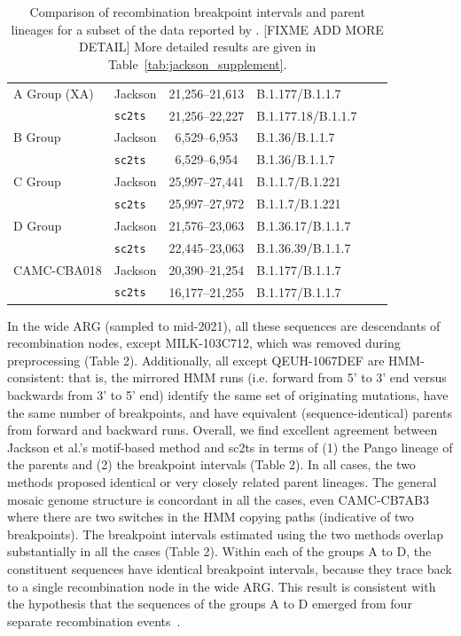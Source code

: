 \documentclass{article}
\begin{document}
\begin{table} \centering
\begin{tabular}{ll|clll}
\toprule
A Group (XA) & Jackson        &  21,256–21,613 & B.1.177/B.1.1.7 \\
             & \texttt{sc2ts} &  21,256--22,227 & B.1.177.18/B.1.1.7 \\
\midrule
B Group & Jackson        &  6,529--6,953 & B.1.36/B.1.1.7  \\
        & \texttt{sc2ts} &  6,529--6,954 & B.1.36/B.1.1.7  \\
\midrule
C Group & Jackson        &  25,997--27,441 &  B.1.1.7/B.1.221 \\
        & \texttt{sc2ts} &  25,997--27,972 &  B.1.1.7/B.1.221 \\
\midrule
D Group & Jackson        &  21,576--23,063 &  B.1.36.17/B.1.1.7 \\
        & \texttt{sc2ts} &  22,445--23,063 &  B.1.36.39/B.1.1.7 \\
\midrule
CAMC-CBA018 & Jackson        &  20,390--21,254 & B.1.177/B.1.1.7 \\
            & \texttt{sc2ts} &  16,177--21,255 & B.1.177/B.1.1.7 \\
\midrule
\end{tabular}
\caption{\label{tab:jackson}Comparison of recombination breakpoint intervals and parent lineages for a subset of the data reported by \cite{Jackson2021-ik}. [FIXME ADD MORE DETAIL] More detailed results are given in Table~\ref{tab:jackson_supplement}.}
\end{table}

In the wide ARG (sampled to mid-2021), all these sequences are descendants of
recombination nodes, except MILK-103C712, which was removed during
preprocessing (Table 2). Additionally, all except QEUH-1067DEF are HMM-consistent:
that is, the mirrored HMM runs (i.e. forward from 5’ to 3’ end versus backwards from 3’ to 5’ end)
identify the same set of originating mutations, have the same number of breakpoints, and have
equivalent (sequence-identical) parents from forward and backward runs.
Overall, we find excellent agreement between Jackson et al.'s
motif-based method and sc2ts in terms of (1) the Pango lineage of the parents
and (2) the breakpoint intervals (Table 2). In all cases, the two methods
proposed identical or very closely related parent lineages. The general mosaic
genome structure is concordant in all the cases, even CAMC-CB7AB3 where there
are two switches in the HMM copying paths (indicative of two breakpoints). The
breakpoint intervals estimated using the two methods overlap substantially in
all the cases (Table 2). Within each of the groups A to D, the constituent
sequences have identical breakpoint intervals, because they trace back to a
single recombination node in the wide ARG. This result is consistent with the
hypothesis that the sequences of the groups A to D emerged from four separate
recombination events~\cite{Jackson2021-ik}.
\end{document}
